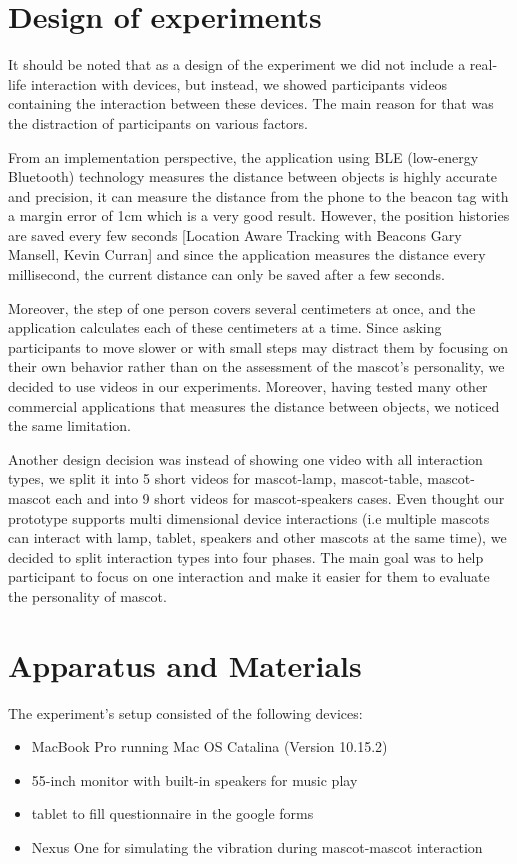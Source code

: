 \section{Design of experiments}
\label{sec:design-of-experiments}
\par It should be noted that as a design of the experiment we did not include a
real-life interaction with devices, but instead, we showed participants videos
containing the interaction between these devices.
The main reason for that was the distraction of participants on various factors.
\par From an implementation perspective, the application using BLE (low-energy Bluetooth)
technology measures the distance between objects is highly accurate and precision,
it can measure the distance from the phone to the beacon tag with a margin error of 1cm which is a very good result.
However, the position histories are saved every few seconds [Location Aware Tracking with Beacons Gary Mansell, Kevin Curran] and
since the application measures the distance every millisecond, the current distance can only be saved after a few seconds.
\par Moreover, the step of one person covers several centimeters at once, and the
application calculates each of these centimeters at a time.
Since asking participants to move slower or with small steps may distract
them by focusing on their own behavior rather than on the assessment of the
mascot's personality, we decided to use videos in our experiments.
Moreover, having tested many other commercial applications that measures the distance between objects,
we noticed the same limitation.
\par Another design decision was instead of showing one video with all interaction types,
we split it into 5 short videos for mascot-lamp, mascot-table, mascot-mascot each
and into 9 short videos for mascot-speakers cases.
Even thought our prototype supports multi dimensional device interactions
(i.e multiple mascots can interact with lamp, tablet, speakers and other mascots at the same time),
we decided to split interaction types into four phases.
The main goal was to help participant to focus on one interaction and make
it easier for them to evaluate the personality of mascot.

\section{Apparatus and Materials}
\label{sec:apparatus-and-materials}
The experiment’s setup consisted of the following devices:
\begin{itemize}
  \item MacBook Pro running Mac OS Catalina (Version 10.15.2)
  \item 55-inch monitor with built-in speakers for music play
  \item tablet to fill questionnaire in the google forms
  \item Nexus One for simulating the vibration during mascot-mascot interaction
\end{itemize}

